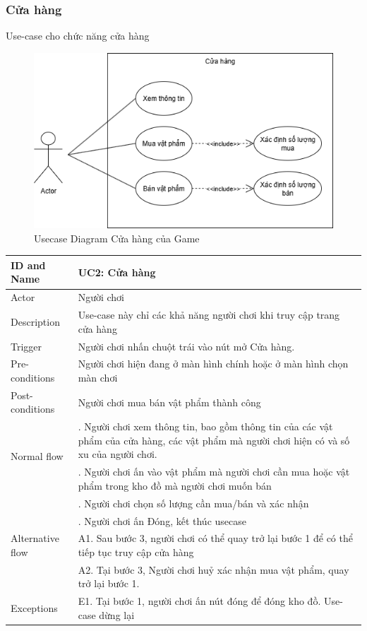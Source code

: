 \subsubsection{Cửa hàng}
Use-case cho chức năng cửa hàng
\begin{figure}[H]
	\centering
	\includegraphics[width=14cm]{Images/ShopUCD.png}
	\vspace{0.5cm}
	\caption{Usecase Diagram Cửa hàng của Game}
\end{figure}
\begin{center}
	\begin{tabular}{|l|p{12cm}|}
		\hline
		ID and Name & UC2: Cửa hàng \\
		\hline
		Actor  & Người chơi \\
		\hline
		Description  & Use-case này chỉ các khả năng người chơi khi truy cập trang cửa hàng\\
		\hline
		Trigger  & Người chơi nhấn chuột trái vào nút mở Cửa hàng.\\
		\hline
		Pre-conditions & Người chơi hiện đang ở màn hình chính hoặc ở màn hình chọn màn chơi\\
		\hline
		Post-conditions & Người chơi mua bán vật phẩm thành công\\
		\hline
		\multirow{2}{*}{Normal flow}      &\qquad 1. Người chơi xem thông tin, bao gồm thông tin của các vật phẩm của cửa hàng, các vật phẩm mà người chơi hiện có và số xu của người chơi.\\
		&\qquad 2. Người chơi ấn vào vật phẩm mà người chơi cần mua hoặc vật phẩm trong kho đồ mà người chơi muốn bán\\
		&\qquad 3. Người chơi chọn số lượng cần mua/bán và xác nhận\\
		&\qquad 4. Người chơi ấn Đóng, kết thúc usecase\\
		\hline
		Alternative flow  & \qquad A1. Sau bước 3, người chơi có thể quay trở lại bước 1 để có thể tiếp tục truy cập cửa hàng\\
		&\qquad A2. Tại bước 3, Người chơi huỷ xác nhận mua vật phẩm, quay trở lại bước 1.\\
		\hline
		Exceptions  & E1. Tại bước 1, người chơi ấn nút đóng để đóng kho đồ. Use-case dừng lại\\
		\hline
	\end{tabular}
\end{center}
